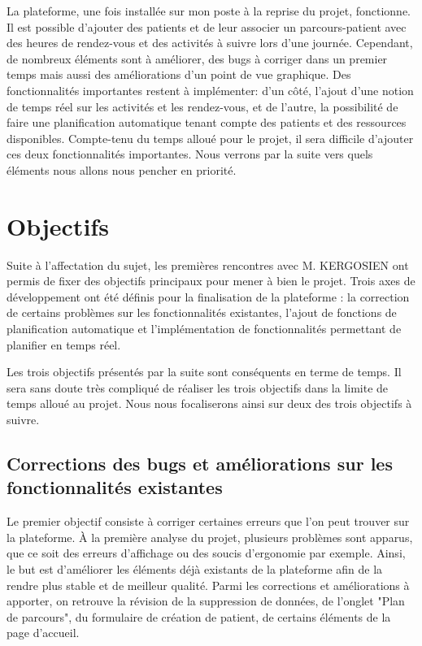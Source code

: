 \documentclass{polytech/polytech}
\begin{document}
La plateforme, une fois installée sur mon poste à la reprise du projet, fonctionne. Il est possible d'ajouter des patients et de leur associer un parcours-patient avec des heures de rendez-vous et des activités à suivre lors d'une journée. Cependant, de nombreux éléments sont à améliorer, des bugs à corriger dans un premier temps mais aussi des améliorations d'un point de vue graphique. Des fonctionnalités importantes restent à implémenter: d'un côté, l'ajout d'une notion de temps réel sur les activités et les rendez-vous, et de l'autre, la possibilité de faire une planification automatique tenant compte des patients et des ressources disponibles. Compte-tenu du temps alloué pour le projet, il sera difficile d'ajouter ces deux fonctionnalités importantes. Nous verrons par la suite vers quels éléments nous allons nous pencher en priorité. 


\section{Objectifs}

Suite à l'affectation du sujet, les premières rencontres avec M. KERGOSIEN ont permis de fixer des objectifs principaux pour mener à bien le projet. Trois axes de développement ont été définis pour la finalisation de la plateforme : la correction de certains problèmes sur les fonctionnalités existantes, l'ajout de fonctions de planification automatique et l'implémentation de fonctionnalités permettant de planifier en temps réel. 

Les trois objectifs présentés par la suite sont conséquents en terme de temps. Il sera sans doute très compliqué de réaliser les trois objectifs dans la limite de temps alloué au projet. Nous nous focaliserons ainsi sur deux des trois objectifs à suivre. 


\subsection{Corrections des bugs et améliorations sur les fonctionnalités existantes}

Le premier objectif consiste à corriger certaines erreurs que l'on peut trouver sur la plateforme. À la première analyse du projet, plusieurs problèmes sont apparus, que ce soit des erreurs d'affichage ou des soucis d'ergonomie par exemple. Ainsi, le but est d'améliorer les éléments déjà existants de la plateforme afin de la rendre plus stable et de meilleur qualité. Parmi les corrections et améliorations à apporter, on retrouve la révision de la suppression de données, de l'onglet "Plan de parcours", du formulaire de création de patient, de certains éléments de la page d'accueil. 
\end{document}
